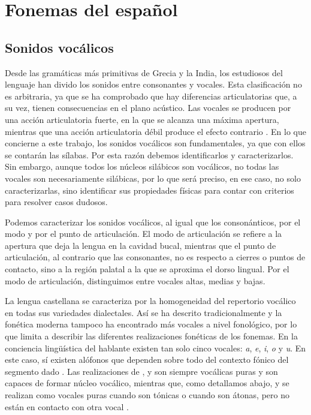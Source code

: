 \section{Fonemas del español}
\subsection{Sonidos vocálicos}
Desde las gramáticas más primitivas de Grecia y la India, los estudiosos del lenguaje han divido los sonidos entre consonantes y vocales. Esta clasificación no es arbitraria, ya que se ha comprobado que hay diferencias articulatorias que, a su vez, tienen consecuencias en el plano acústico. Las vocales se producen por una acción articulatoria fuerte, en la que se alcanza una máxima apertura, mientras que una acción articulatoria débil produce el efecto contrario \parencite[141-143]{quilis2019}. En lo que concierne a este trabajo, los sonidos vocálicos son fundamentales, ya que con ellos se contarán las sílabas. Por esta razón debemos identificarlos y caracterizarlos. Sin embargo, aunque todos los núcleos silábicos son vocálicos, no todas las vocales  son necesariamente silábicas, por lo que será preciso, en ese caso, no solo caracterizarlas, sino identificar sus propiedades físicas para contar con criterios para resolver casos dudosos.

Podemos caracterizar los sonidos vocálicos, al igual que los consonánticos, por el modo y por el punto de articulación. El modo de articulación se refiere a la apertura que deja la lengua en la cavidad bucal, mientras que el punto de articulación, al contrario que las consonantes, no es respecto a cierres o puntos de contacto, sino a la región palatal a la que se aproxima el dorso lingual. Por el modo de articulación, distinguimos entre vocales altas, medias y bajas.

La lengua castellana se caracteriza por la homogeneidad del repertorio vocálico en todas sus variedades dialectales. Así se ha descrito tradicionalmente y la fonética moderna tampoco ha encontrado más vocales a nivel fonológico, por lo que limita a describir las diferentes realizaciones fonéticas de los fonemas. En la conciencia lingüística del hablante existen tan solo cinco vocales: \textit{a}, \textit{e}, \textit{i}, \textit{o} y \textit{u}. En este caso, sí existen alófonos que dependen sobre todo del contexto fónico del segmento dado \parencite[32]{navarrotomas1946}. Las realizaciones de ,  y  son siempre vocálicas puras y son capaces de formar núcleo vocálico, mientras que, como detallamos abajo,  y  se realizan como vocales puras cuando son tónicas o cuando son átonas, pero no están en contacto con otra vocal \parencite[152-153]{alarcos1964}.

